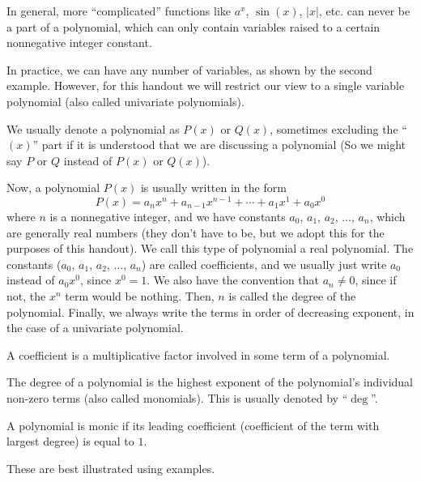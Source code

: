 \documentclass[11pt]{scrartcl}
\begin{document}
In general, more ``complicated'' functions like $a^x$, $\sin(x)$, $|x|$, etc. can never be a part of a polynomial, which can only contain variables raised to a certain nonnegative integer constant.

In practice, we can have any number of variables, as shown by the second example. However, for this handout we will restrict our view to a single variable polynomial (also called univariate polynomials).

We usually denote a polynomial as $P(x)$ or $Q(x)$, sometimes excluding the ``$(x)$'' part if it is understood that we are discussing a polynomial (So we might say $P$ or $Q$ instead of $P(x)$ or $Q(x)$).

Now, a polynomial $P(x)$ is usually written in the form \[P(x) = a_nx^n + a_{n-1}x^{n-1}+\cdots+a_1x^1+a_0x^0\] where $n$ is a nonnegative integer, and we have constants $a_0$, $a_1$, $a_2$, $\dots$, $a_n$, which are generally real numbers (they don't have to be, but we adopt this for the purposes of this handout). We call this type of polynomial a real polynomial. The constants ($a_0$, $a_1$, $a_2$, $\dots$, $a_n$) are called coefficients, and we usually just write $a_0$ instead of $a_0x^0$, since $x^0 = 1$. We also have the convention that $a_n \neq 0$, since if not, the $x^n$ term would be nothing. Then, $n$ is called the degree of the polynomial. Finally, we always write the terms in order of decreasing exponent, in the case of a univariate polynomial.

\begin{definition*}[Coefficient]
A coefficient is a multiplicative factor involved in some term of a polynomial.
\end{definition*}

\begin{definition*}[Degree]
The degree of a polynomial is the highest exponent of the polynomial's individual non-zero terms (also called monomials). This is usually denoted by ``$\deg$''.
\end{definition*}

\begin{definition*}
A polynomial is monic if its leading coefficient (coefficient of the term with largest degree) is equal to $1$.
\end{definition*}

These are best illustrated using examples.
\end{document}

